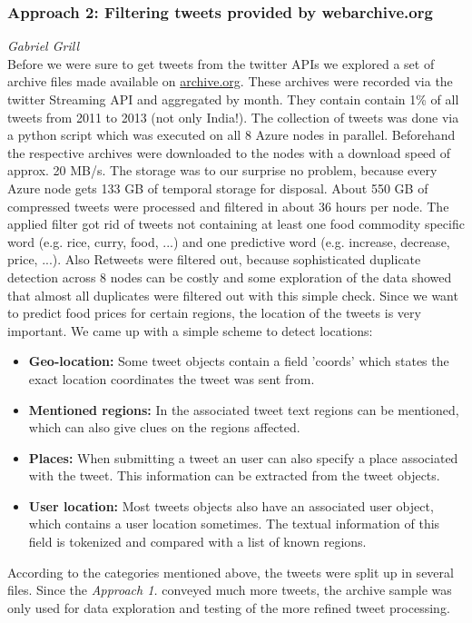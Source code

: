 \subsubsection*{Approach 2: Filtering tweets provided by webarchive.org}
\emph{Gabriel Grill} \\
Before we were sure to get tweets from the twitter APIs we explored a set of archive files made available on \href{https://archive.org/details/twitterstream}{archive.org}. These archives were recorded via the twitter Streaming API and aggregated by month.
They contain contain 1\% of all tweets from 2011 to 2013 (not only India!). The collection of tweets was done via a python script which was executed on all 8 Azure nodes in parallel. Beforehand the respective archives were downloaded to the nodes with a download speed of approx. 20 MB/s. The storage was to our surprise no problem, because every Azure node gets 133 GB of temporal storage for disposal. About 550 GB of compressed tweets were processed and filtered in about 36 hours per node.
\newline
The applied filter got rid of tweets not containing at least one food commodity specific word (e.g. rice, curry, food, ...) and one predictive word (e.g. increase, decrease, price, ...). Also Retweets were filtered out, because sophisticated duplicate detection across 8 nodes can be costly and some exploration of the data showed that almost all duplicates were filtered out with this simple check. Since we want to predict food prices for certain regions, the location of the tweets is very important. We came up with a simple scheme to detect locations:
\begin{itemize}
\item \textbf{Geo-location:} Some tweet objects contain a field 'coords' which states the exact location coordinates the tweet was sent from.
\item \textbf{Mentioned regions:} In the associated tweet text regions can be mentioned, which can also give clues on the regions affected.
\item \textbf{Places:} When submitting a tweet an user can also specify a place associated with the tweet. This information can be extracted from the tweet objects.
\item \textbf{User location:} Most tweets objects also have an associated user object, which contains a user location sometimes. The textual information of this field is tokenized and compared with a list of known regions.
\end{itemize}
According to the categories mentioned above, the tweets were split up in several files. Since the \emph{Approach 1.} conveyed much more tweets, the archive sample was only used for data exploration and testing of the more refined tweet processing.

